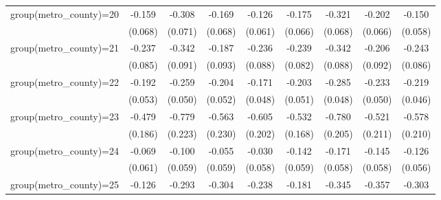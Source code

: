 {\begin{tabular}{l*{8}{c}}
group(metro\_county)=20&      -0.159\sym{**} &      -0.308\sym{***}&      -0.169\sym{**} &      -0.126\sym{**} &      -0.175\sym{**} &      -0.321\sym{***}&      -0.202\sym{***}&      -0.150\sym{**} \\
                    &     (0.068)         &     (0.071)         &     (0.068)         &     (0.061)         &     (0.066)         &     (0.068)         &     (0.066)         &     (0.058)         \\
group(metro\_county)=21&      -0.237\sym{**} &      -0.342\sym{***}&      -0.187\sym{**} &      -0.236\sym{**} &      -0.239\sym{***}&      -0.342\sym{***}&      -0.206\sym{**} &      -0.243\sym{***}\\
                    &     (0.085)         &     (0.091)         &     (0.093)         &     (0.088)         &     (0.082)         &     (0.088)         &     (0.092)         &     (0.086)         \\
group(metro\_county)=22&      -0.192\sym{***}&      -0.259\sym{***}&      -0.204\sym{***}&      -0.171\sym{***}&      -0.203\sym{***}&      -0.285\sym{***}&      -0.233\sym{***}&      -0.219\sym{***}\\
                    &     (0.053)         &     (0.050)         &     (0.052)         &     (0.048)         &     (0.051)         &     (0.048)         &     (0.050)         &     (0.046)         \\
group(metro\_county)=23&      -0.479\sym{**} &      -0.779\sym{***}&      -0.563\sym{**} &      -0.605\sym{***}&      -0.532\sym{***}&      -0.780\sym{***}&      -0.521\sym{**} &      -0.578\sym{**} \\
                    &     (0.186)         &     (0.223)         &     (0.230)         &     (0.202)         &     (0.168)         &     (0.205)         &     (0.211)         &     (0.210)         \\
group(metro\_county)=24&      -0.069         &      -0.100\sym{*}  &      -0.055         &      -0.030         &      -0.142\sym{**} &      -0.171\sym{***}&      -0.145\sym{**} &      -0.126\sym{**} \\
                    &     (0.061)         &     (0.059)         &     (0.059)         &     (0.058)         &     (0.059)         &     (0.058)         &     (0.058)         &     (0.056)         \\
group(metro\_county)=25&      -0.126\sym{*}  &      -0.293\sym{***}&      -0.304\sym{***}&      -0.238\sym{***}&      -0.181\sym{**} &      -0.345\sym{***}&      -0.357\sym{***}&      -0.303\sym{***}\\

\end{tabular}}
